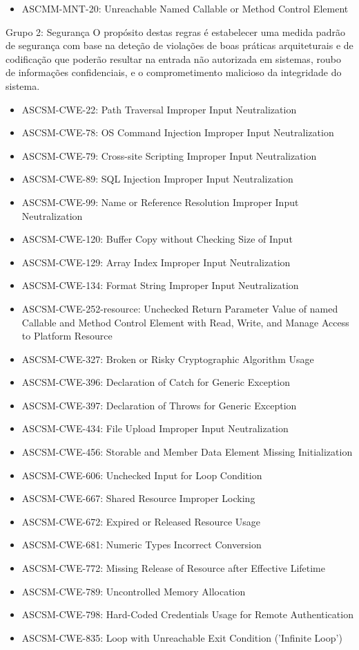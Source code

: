 \documentclass[openany,10pt,a4paper]{article}
\begin{document}
\begin{appendix}
\begin{samepage}
\begin{itemize}
	\item ASCMM-MNT-20: Unreachable Named Callable or Method Control Element
\end{itemize}
\end{samepage}
Grupo 2: Segurança
O propósito destas regras é estabelecer uma medida padrão de segurança com base na deteção de violações de boas práticas arquiteturais e de codificação que poderão resultar na entrada não autorizada em sistemas, roubo de informações confidenciais, e o comprometimento malicioso da integridade do sistema.
\begin{itemize}
	\setlength\itemsep{0em}
	\item ASCSM-CWE-22: Path Traversal Improper Input Neutralization
	\item ASCSM-CWE-78: OS Command Injection Improper Input Neutralization
	\item ASCSM-CWE-79: Cross-site Scripting Improper Input Neutralization
	\item ASCSM-CWE-89: SQL Injection Improper Input Neutralization
	\item ASCSM-CWE-99: Name or Reference Resolution Improper Input Neutralization
	\item ASCSM-CWE-120: Buffer Copy without Checking Size of Input
	\item ASCSM-CWE-129: Array Index Improper Input Neutralization
	\item ASCSM-CWE-134: Format String Improper Input Neutralization
	\item ASCSM-CWE-252-resource: Unchecked Return Parameter Value of named Callable and Method Control Element with Read, Write, and Manage Access to Platform Resource
	\item ASCSM-CWE-327: Broken or Risky Cryptographic Algorithm Usage
	\item ASCSM-CWE-396: Declaration of Catch for Generic Exception
	\item ASCSM-CWE-397: Declaration of Throws for Generic Exception
	\item ASCSM-CWE-434: File Upload Improper Input Neutralization
	\item ASCSM-CWE-456: Storable and Member Data Element Missing Initialization
	\item ASCSM-CWE-606: Unchecked Input for Loop Condition
	\item ASCSM-CWE-667: Shared Resource Improper Locking
	\item ASCSM-CWE-672: Expired or Released Resource Usage
	\item ASCSM-CWE-681: Numeric Types Incorrect Conversion
	\item ASCSM-CWE-772: Missing Release of Resource after Effective Lifetime
	\item ASCSM-CWE-789: Uncontrolled Memory Allocation
	\item ASCSM-CWE-798: Hard-Coded Credentials Usage for Remote Authentication
	\item ASCSM-CWE-835: Loop with Unreachable Exit Condition ('Infinite Loop')
\end{itemize} 


\end{appendix}
\end{document}
